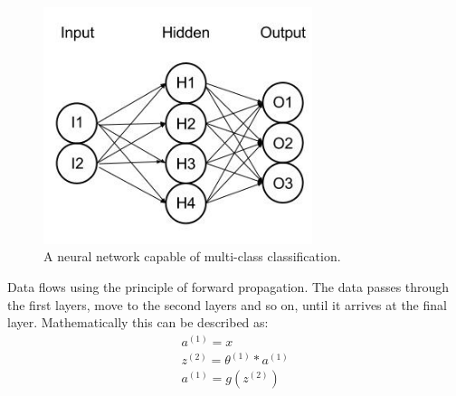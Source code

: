 \begin{figure}[H]
\centering
\includegraphics[width=0.7\textwidth]{Figures/neuralnetmulti}
\decoRule
\caption[Neural network with multi-class classification]{A neural network capable of multi-class classification.}
\label{fig:neuralnetworkmult}
\end{figure}
\noindent Data flows using the principle of forward propagation. The data passes through the first layers, move to the second layers and so on, until it arrives at the final layer. Mathematically this can be described as: 
\begin{align*}
a^{(1)} = x\\
z^{(2)} = \theta^{(1)}*a^{(1)}\\
a^{(1)} = g(z^{(2)})
\end{align*}

